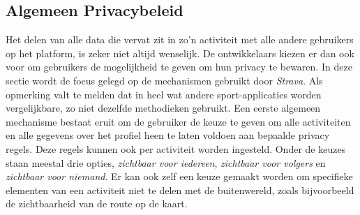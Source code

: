 \subsection{Algemeen Privacybeleid}\label{Algemene Privacy}
Het delen van alle data die vervat zit in zo'n activiteit met alle andere
gebruikers op het platform, is zeker niet altijd wenselijk. De ontwikkelaars
kiezen er dan ook voor om gebruikers de mogelijkheid te geven om hun privacy te
bewaren. In deze sectie wordt de focus gelegd op de mechanismen gebruikt door
\textit{Strava}. Als opmerking valt te melden dat in heel wat andere
sport-applicaties worden vergelijkbare, zo niet dezelfde methodieken gebruikt.
Een eerste algemeen mechanisme bestaat eruit om de gebruiker de keuze te geven
om alle activiteiten en alle gegevens over het profiel heen te laten voldoen
aan bepaalde privacy regels. Deze regels kunnen ook per activiteit worden
ingesteld. Onder de keuzes staan meestal drie opties, \textit{zichtbaar voor
    iedereen}, \textit{zichtbaar voor volgers} en \textit{zichtbaar voor niemand}.
Er kan ook zelf een keuze gemaakt worden om specifieke elementen van een
activiteit niet te delen met de buitenwereld, zoals bijvoorbeeld de
zichtbaarheid van de route op de kaart.\cite{Activity24:online}

